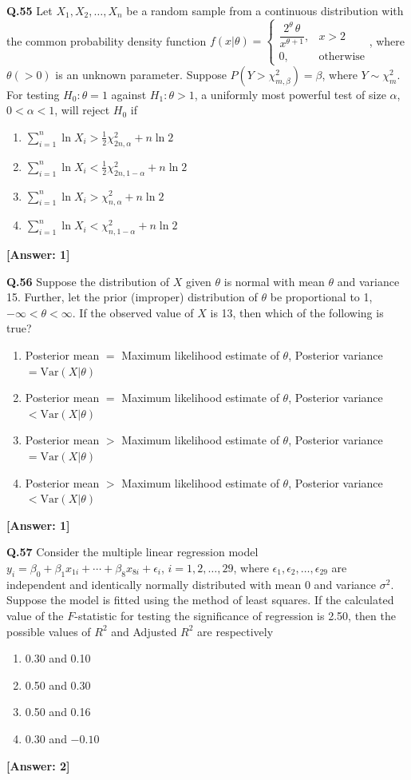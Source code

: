 \documentclass[12pt,a4paper]{article}
\newcommand{\ans}[1]{\quad\textcolor{anscolor}{\textbf{[Answer: #1]}}}
\begin{document}
\textbf{Q.55} Let $X_1,X_2,\ldots,X_n$ be a random sample from a continuous distribution with the common probability density function $f(x|\theta)=\begin{cases}\dfrac{2^\theta\,\theta}{x^{\theta+1}},&x>2\\0,&\text{otherwise}\end{cases}$, where $\theta(>0)$ is an unknown parameter. Suppose $P(Y>\chi^2_{m,\beta})=\beta$, where $Y\sim\chi^2_m$. For testing $H_0:\theta=1$ against $H_1:\theta>1$, a uniformly most powerful test of size $\alpha$, $0<\alpha<1$, will reject $H_0$ if
\begin{enumerate}[label=\arabic*.]
\item $\sum_{i=1}^n\ln X_i>\tfrac{1}{2}\chi^2_{2n,\alpha}+n\ln2$
\item $\sum_{i=1}^n\ln X_i<\tfrac{1}{2}\chi^2_{2n,1-\alpha}+n\ln2$
\item $\sum_{i=1}^n\ln X_i>\chi^2_{n,\alpha}+n\ln2$
\item $\sum_{i=1}^n\ln X_i<\chi^2_{n,1-\alpha}+n\ln2$
\end{enumerate}\ans{1}

\textbf{Q.56} Suppose the distribution of $X$ given $\theta$ is normal with mean $\theta$ and variance 15. Further, let the prior (improper) distribution of $\theta$ be proportional to 1, $-\infty<\theta<\infty$. If the observed value of $X$ is 13, then which of the following is true?
\begin{enumerate}[label=\arabic*.]
\item Posterior mean $=$ Maximum likelihood estimate of $\theta$, Posterior variance $=\text{Var}(X|\theta)$
\item Posterior mean $=$ Maximum likelihood estimate of $\theta$, Posterior variance $<\text{Var}(X|\theta)$
\item Posterior mean $>$ Maximum likelihood estimate of $\theta$, Posterior variance $=\text{Var}(X|\theta)$
\item Posterior mean $>$ Maximum likelihood estimate of $\theta$, Posterior variance $<\text{Var}(X|\theta)$
\end{enumerate}\ans{1}

\textbf{Q.57} Consider the multiple linear regression model $y_i=\beta_0+\beta_1x_{1i}+\cdots+\beta_8x_{8i}+\epsilon_i$, $i=1,2,\ldots,29$, where $\epsilon_1,\epsilon_2,\ldots,\epsilon_{29}$ are independent and identically normally distributed with mean 0 and variance $\sigma^2$. Suppose the model is fitted using the method of least squares. If the calculated value of the $F$-statistic for testing the significance of regression is 2.50, then the possible values of $R^2$ and Adjusted $R^2$ are respectively
\begin{enumerate}[label=\arabic*.]
\item 0.30 and 0.10 \item 0.50 and 0.30 \item 0.50 and 0.16 \item 0.30 and $-0.10$
\end{enumerate}\ans{2}
\end{document}
